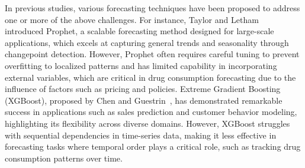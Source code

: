 \documentclass[journal]{IEEEtran}
\begin{document}
In previous studies, various forecasting techniques have been proposed to address one or more of the above challenges. For instance, Taylor and Letham~\cite{taylor2018forecasting} introduced Prophet, a scalable forecasting method designed for large-scale applications, which excels at capturing general trends and seasonality through changepoint detection. However, Prophet often requires careful tuning to prevent overfitting to localized patterns and has limited capability in incorporating external variables, which are critical in drug consumption forecasting due to the influence of factors such as pricing and policies. Extreme Gradient Boosting (XGBoost), proposed by Chen and Guestrin~\cite{chen2016xgboost}, has demonstrated remarkable success in applications such as sales prediction and customer behavior modeling, highlighting its flexibility across diverse domains. However, XGBoost struggles with sequential dependencies in time-series data, making it less effective in forecasting tasks where temporal order plays a critical role, such as tracking drug consumption patterns over time.
\end{document}

